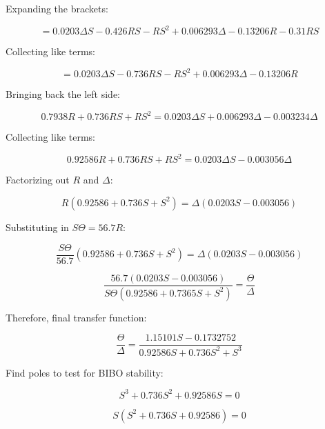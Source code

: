 \documentclass{article}
\numberwithin{equation}{section}
\begin{document}
Expanding the brackets:

\begin{equation}
= 0.0203\Delta S - 0.426RS - RS^2 + 0.006293\Delta - 0.13206R - 0.31RS
\end{equation}

Collecting like terms:

\begin{equation}
= 0.0203 \Delta S - 0.736RS - RS^2 + 0.006293\Delta - 0.13206R
\end{equation}

Bringing back the left side:

\begin{equation}
0.7938R + 0.736 RS + RS^2 = 0.0203\Delta S + 0.006293\Delta - 0.003234\Delta
\end{equation}

Collecting like terms:

\begin{equation}
0.92586R + 0.736 RS + RS^2 = 0.0203 \Delta S - 0.003056\Delta
\end{equation}

Factorizing out \(R\) and \(\Delta\):

\begin{equation}
R(0.92586 + 0.736S + S^2) = \Delta(0.0203S - 0.003056)
\end{equation}

Substituting in \(S\Theta = 56.7R\):

\begin{equation}
\frac{S\Theta}{56.7}(0.92586 + 0.736S + S^2) = \Delta(0.0203S - 0.003056)
\end{equation}

\begin{equation}
\frac{56.7(0.0203S - 0.003056)}{S\Theta(0.92586 + 0.7365S + S^2)} = \frac{\Theta}{\Delta}
\end{equation}

Therefore, final transfer function:

\begin{equation}
\frac{\Theta}{\Delta} = \frac{1.15101S - 0.1732752}{0.92586S + 0.736S^2 + S^3}
\end{equation}

Find poles to test for BIBO stability:

\begin{equation}
S^3 + 0.736S^2 + 0.92586S = 0
\end{equation}

\begin{equation}
S(S^2 + 0.736S + 0.92586) = 0
\end{equation}
\end{document}
